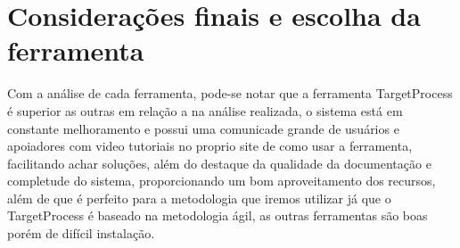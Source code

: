\section{Considerações finais e escolha da ferramenta}

  Com a análise de cada ferramenta, pode-se notar que a ferramenta TargetProcess é superior as outras em relação a na análise realizada,
  o sistema está em constante melhoramento e possui uma comunicade grande de usuários e apoiadores com
  video tutoriais no proprio site de como usar a ferramenta, facilitando achar soluções, além do destaque da qualidade
  da documentação e completude do sistema, proporcionando um bom aproveitamento dos recursos, além de que é perfeito para a metodologia
  que iremos utilizar já que o TargetProcess é baseado na metodologia ágil, as outras ferramentas são boas porém de difícil instalação.

